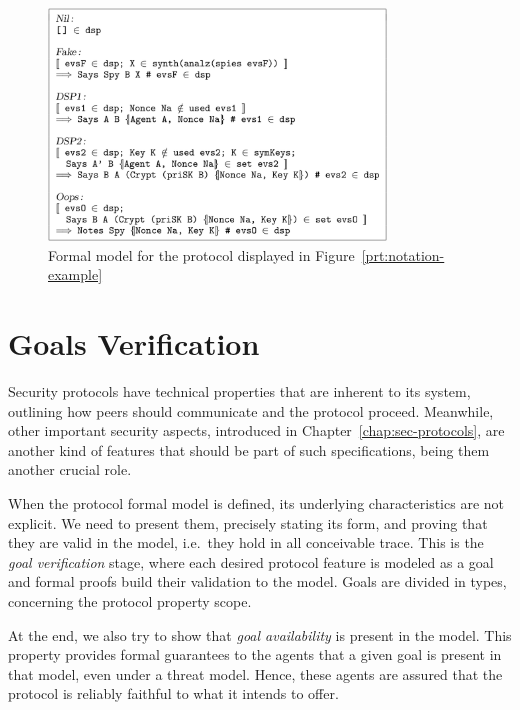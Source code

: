 \begin{figure}\label{fig:notation-example-model}
  \centering
  \includegraphics[width=0.8\textwidth]{img/prt-example-model}
  \caption{Formal model for the protocol displayed in Figure~\ref{prt:notation-example}}
\end{figure}





\section{Goals Verification}
Security protocols have technical properties that are inherent to its system, outlining how peers should communicate and the protocol proceed. Meanwhile, other important security aspects, introduced in Chapter~\ref{chap:sec-protocols}, are another kind of features that should be part of such specifications, being them another crucial role.

When the protocol formal model is defined, its underlying characteristics are not explicit. We need to present them, precisely stating its form, and proving that they are valid in the model, i.e.\ they hold in all conceivable trace. This is the \textit{goal verification} stage, where each desired protocol feature is modeled as a goal and formal proofs build their validation to the model. Goals are divided in types, concerning the protocol property scope.

At the end, we also try to show that \textit{goal availability} is present in the model. This property provides formal guarantees to the agents that a given goal is present in that model, even under a threat model. Hence, these agents are assured that the protocol is reliably faithful to what it intends to offer.




